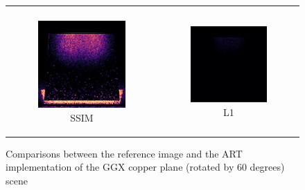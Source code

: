 \begin{figure}[h]
\begin{tabular}{cc}
\begin{subfigure}
			\caption{ART - our implementation}
		\end{subfigure} \\
		\begin{subfigure}
			{0.4\textwidth}\centering\includegraphics[width=\linewidth]{img/ggx_copper_60_SSIM.png}
			\caption{SSIM}
		\end{subfigure} 
		&
		\begin{subfigure}
			{0.4\textwidth}\centering\includegraphics[width=\linewidth]{img/ggx_copper_60_L1.png}
			\caption{L1}
		\end{subfigure}
	\end{tabular}
	\caption{Comparisons between the reference image and the ART implementation of the GGX copper plane (rotated by 60 degrees) scene}
	\label{fig:compare_ggx_copper}
\end{figure}

